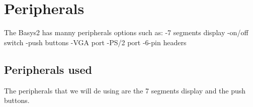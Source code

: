 \section{Peripherals}
\label{sec:periphs}

The Basys2 has manny peripherals options such as:
-7 segments display
-on/off switch
-push buttons
-VGA port
-PS/2 port
-6-pin headers

\subsection{Peripherals used}

The peripherals that we will de using are the 7 segments display and the push buttons.


